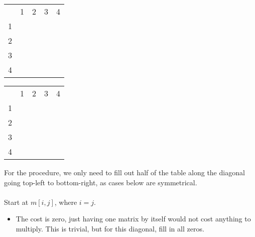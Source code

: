 \documentclass{article}
\begin{document}
\newpage

\begin{center}
\label*{$m$}
\begin{tabular}{ c|c|c|c|c| }
    \multicolumn{1}{c}{}
    & \multicolumn{1}{c}{1}
    & \multicolumn{1}{c}{2}
    & \multicolumn{1}{c}{3}
    & \multicolumn{1}{c}{4}\\

    \cline{2-5}
        1 &  &  &  &  \\
    \cline{2-5}
        2 &  &  &  &  \\
    \cline{2-5}
        3 &  &  &  &  \\
    \cline{2-5}
        4 &  &  &  &  \\
    \cline{2-5}
\end{tabular}
\end{center}

\begin{center}
\label*{$s$}
\begin{tabular}{ c|c|c|c|c| }
    \multicolumn{1}{c}{}
    & \multicolumn{1}{c}{1}
    & \multicolumn{1}{c}{2}
    & \multicolumn{1}{c}{3}
    & \multicolumn{1}{c}{4}\\

    \cline{2-5}
        1 &  &  &  &  \\
    \cline{2-5}
        2 &  &  &  &  \\
    \cline{2-5}
        3 &  &  &  &  \\
    \cline{2-5}
        4 &  &  &  &  \\
    \cline{2-5}
\end{tabular}
\end{center}

For the procedure, we only need to fill out half of the table along the diagonal going top-left to bottom-right, as cases below are symmetrical.
\\ \\
Start at $m[i, j]$, where $i=j$.
\begin{itemize}
    \item The cost is zero, just having one matrix by itself would not cost anything to multiply. This is trivial, but for this diagonal, fill in all zeros.
\end{itemize}
\end{document}
